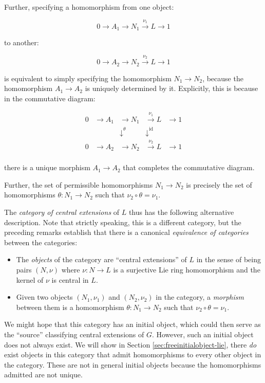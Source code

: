\documentclass{ucetd}
\begin{document}
Further, specifying a homomorphism from one object:

$$0 \to A_1 \to N_1 \stackrel{\nu_1}{\to} L \to 1$$

to another:

$$0 \to A_2 \to N_2 \stackrel{\nu_2}{\to} L \to 1$$

is equivalent to simply specifying the homomorphism $N_1 \to N_2$,
because the homomorphism $A_1 \to A_2$ is uniquely determined by
it. Explicitly, this is because in the commutative diagram:

$$\begin{array}{rrrrr}
  0 & \to A_1 & \to N_1 & \stackrel{\nu_1}{\to} L & \to 1 \\
  &  & \downarrow^{\theta} & \downarrow^{\text{id}} &\\
  0 & \to A_2 & \to N_2 & \stackrel{\nu_2}{\to} L & \to 1 \\
\end{array}$$

there is a unique morphism $A_1 \to A_2$ that completes the
commutative diagram.

Further, the set of permissible homomorphisms
$N_1 \to N_2$ is precisely the set of homomorphisms $\theta: N_1 \to
N_2$ such that $\nu_2 \circ \theta = \nu_1$.

The {\em category of central extensions} of $L$ thus has the following
alternative description. Note that strictly speaking, this is a
different category, but the preceding remarks establish that there is
a canonical {\em equivalence of categories} between the categories:

\begin{itemize}
\item The {\em objects} of the category are ``central extensions'' of
  $L$ in the sense of being pairs $(N,\nu)$ where $\nu:N \to L$ is a
  surjective Lie ring homomorphism and the kernel of $\nu$ is central
  in $L$.
\item Given two objects $(N_1,\nu_1)$ and $(N_2,\nu_2)$ in the
  category, a {\em morphism} between them is a homomorphism $\theta:
  N_1 \to N_2$ such that $\nu_2 \circ \theta = \nu_1$.
\end{itemize}

We might hope that this category has an initial object, which could
then serve as the ``source'' classifying central extensions of
$G$. However, such an initial object does not always exist. We will
show in Section \ref{sec:freeinitialobject-lie}, there {\em do} exist
objects in this category that admit homomorphisms to every other
object in the category. These are not in general initial objects
because the homomorphisms admitted are not unique.
\end{document}
